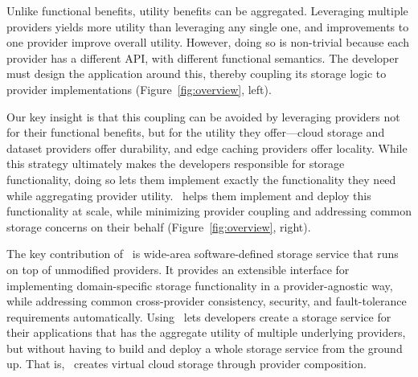 Unlike functional benefits, utility benefits can be aggregated.
Leveraging multiple providers yields more utility than leveraging any single
one, and improvements to one 
provider improve overall utility.
However, doing so is non-trivial because each provider
has a different API, with different functional semantics.  The developer
must design the application around this, thereby coupling its storage logic 
to provider implementations (Figure~\ref{fig:overview}, left).

Our key insight is that this coupling can be avoided by leveraging providers not for 
their functional benefits, but for the utility they offer---cloud
storage and dataset providers offer durability, and edge caching providers offer
locality.  While this strategy ultimately makes the developers responsible for storage functionality, doing so lets them
implement exactly the functionality they need while aggregating provider utility.
\Syndicate\ helps them implement and deploy this functionality at scale, while
minimizing provider coupling and addressing common storage concerns
on their behalf (Figure~\ref{fig:overview}, right).

The key contribution of \Syndicate\ is wide-area software-defined storage
service that runs on top of unmodified providers.  It provides an
extensible interface for implementing domain-specific storage
functionality in a provider-agnostic way, while addressing common cross-provider 
consistency, security, and fault-tolerance requirements automatically.
Using \Syndicate\ lets developers create a storage service for their applications 
that has the aggregate utility of multiple underlying providers, but without having to 
build and deploy a whole storage service from the ground up.
That is, \Syndicate\ creates virtual cloud storage through provider composition.
